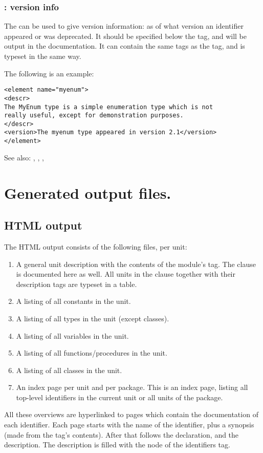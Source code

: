 \subsection{ : version info}
\label{tag:version}
The  can be used to give version information: as of what
version an identifier appeared or was deprecated. It should be specified
below the  tag, and will be output in the documentation.
It can contain the same tags as the  tag, and is typeset
in the same way.

The following is an example:
\begin{verbatim}
<element name="myenum">
<descr>
The MyEnum type is a simple enumeration type which is not
really useful, except for demonstration purposes.
</descr>
<version>The myenum type appeared in version 2.1</version>
</element>
\end{verbatim}
See also: , , , 


\chapter{Generated output files.}
\label{ch:outputfiles}

\section{HTML output}
The HTML output consists of the following files, per unit:

\begin{enumerate}
\item A general unit description with the contents of the module's
  tag. The  clause is documented here as well. 
All units in the  clause together with their 
 description tags are typeset in a table.
\item A listing of all constants in the unit.
\item A listing of all types in the unit (except classes).
\item A listing of all variables in the unit.
\item A listing of all functions/procedures in the unit.
\item A listing of all classes in the unit.
\item An index page per unit and per package. This is an index page, listing
all top-level identifiers in the current unit or all units of the package.
\end{enumerate}
All these overviews are hyperlinked to pages which contain the documentation
of each identifier. Each page starts with the name of the identifier,
plus a synopsis (made from the  tag's contents).  After that
follows the declaration, and the description. The description is filled with
the  node of the identifiers  tag.

